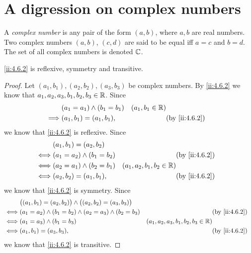 \section{A digression on complex numbers}\label{ii:sec:4.6}

\setcounter{thm}{1}
\begin{defn}\label{ii:4.6.2}
  A \emph{complex number} is any pair of the form \((a, b)\), where \(a, b\) are real numbers.
  Two complex numbers \((a, b)\), \((c, d)\) are said to be equal iff \(a = c\) and \(b = d\).
  The set of all complex numbers is denoted \(\mathbb{C}\).
\end{defn}

\begin{ac}\label{ii:ac:4.6.1}
  \cref{ii:4.6.2} is reflexive, symmetry and transitive.
\end{ac}

\begin{proof}
  Let \((a_1, b_1), (a_2, b_2), (a_3, b_3)\) be complex numbers.
  By \cref{ii:4.6.2} we know that \(a_1, a_2, a_3, b_1, b_2, b_3 \in \mathbb{R}\).
  Since
  \begin{align*}
             & (a_1 = a_1) \land (b_1 = b_1) & (a_1, b_1 \in \R)                 \\
    \implies & (a_1, b_1) = (a_1, b_1),      &                   & \by{ii:4.6.2}
  \end{align*}
  we know that \cref{ii:4.6.2} is reflexive.
  Since
  \begin{align*}
         & (a_1, b_1) = (a_2, b_2)                                                     \\
    \iff & (a_1 = a_2) \land (b_1 = b_2) &                             & \by{ii:4.6.2} \\
    \iff & (a_2 = a_1) \land (b_2 = b_1) & (a_1, a_2, b_1, b_2 \in \R)                 \\
    \iff & (a_2, b_2) = (a_1, b_1),      &                             & \by{ii:4.6.2}
  \end{align*}
  we know that \cref{ii:4.6.2} is symmetry.
  Since
  \begin{align*}
         & \big((a_1, b_1) = (a_2, b_2)\big) \land \big((a_2, b_2) = (a_3, b_3)\big)                                                         \\
    \iff & (a_1 = a_2) \land (b_1 = b_2) \land (a_2 = a_3) \land (b_2 = b_3)         &                                       & \by{ii:4.6.2} \\
    \iff & (a_1 = a_3) \land (b_1 = b_3)                                             & (a_1, a_2, a_3, b_1, b_2, b_3 \in \R)                 \\
    \iff & (a_1, b_1) = (a_3, b_3),                                                  &                                       & \by{ii:4.6.2}
  \end{align*}
  we know that \cref{ii:4.6.2} is transitive.
\end{proof}

